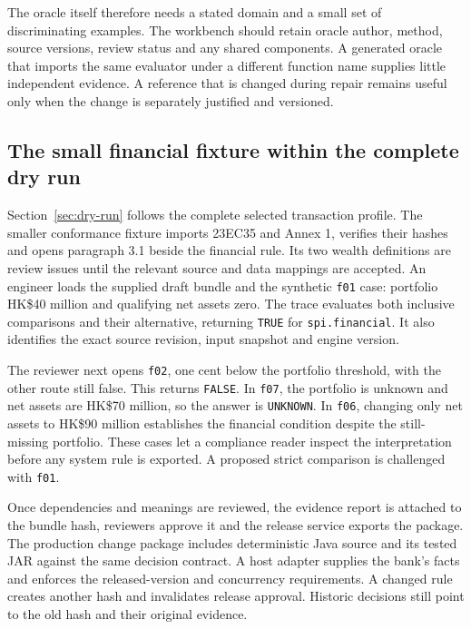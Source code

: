 The oracle itself therefore needs a stated domain and a small set of discriminating
examples. The workbench should retain oracle author, method, source versions,
review status and any shared components. A generated oracle that imports the same
evaluator under a different function name supplies little independent evidence.
A reference that is changed during repair remains useful only when the change is
separately justified and versioned.

\subsection{The small financial fixture within the complete dry run}
\label{merge:P-03c-storage-review:01}


Section~\ref{sec:dry-run} follows the complete selected transaction profile.
The smaller conformance fixture imports 23EC35 and Annex 1, verifies their hashes and
opens paragraph 3.1 beside the financial rule. Its two wealth definitions are
review issues until the relevant source and data mappings are accepted. An
engineer loads the supplied draft bundle and the synthetic \texttt{f01} case:
portfolio HK\$40 million and qualifying net assets zero. The trace evaluates
both inclusive comparisons and their alternative, returning \texttt{TRUE} for
\texttt{spi.financial}. It also identifies the exact source revision, input
snapshot and engine version.


The reviewer next opens \texttt{f02}, one cent below the portfolio threshold,
with the other route still false. This returns \texttt{FALSE}. In \texttt{f07},
the portfolio is unknown and net assets are HK\$70 million, so the answer is
\texttt{UNKNOWN}. In \texttt{f06}, changing only net assets to HK\$90 million
establishes the financial condition despite the still-missing portfolio. These
cases let a compliance reader inspect the interpretation before any system rule
is exported. A proposed strict comparison is challenged with \texttt{f01}.

Once dependencies and meanings are reviewed, the evidence report is attached to
the bundle hash, reviewers approve it and the release service exports the package.
The production change package includes deterministic Java source and its tested
JAR against the same decision contract. A host adapter supplies the bank's
facts and enforces the released-version and concurrency requirements.
A changed rule creates another hash and invalidates release approval. Historic
decisions still point to the old hash and their original evidence.

